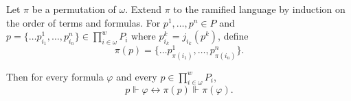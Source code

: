 Let $\pi$ be a permutation of $\omega$. Extend $\pi$ to the ramified language by induction on the order of terms and formulas. For $p^1, \ldots, p^n \in P$ and $p = \{ \ldots p_{i_1}^{1}, \ldots, p_{i_n}^{n} \} \in \prod_{i \in \omega}^{w} P_i$ where $p_{i_k}^{k} = j_{i_k}(p^k)$, define
$$\pi(p) = \{ \ldots p_{\pi(i_1)}^{1}, \ldots, p_{\pi(i_n)}^{n} \}.$$

Then for every formula $\varphi$ and every $p \in \prod_{i \in \omega}^{w} P_i$,
$$p \Vdash \varphi \leftrightarrow \pi(p) \Vdash \pi(\varphi).$$
